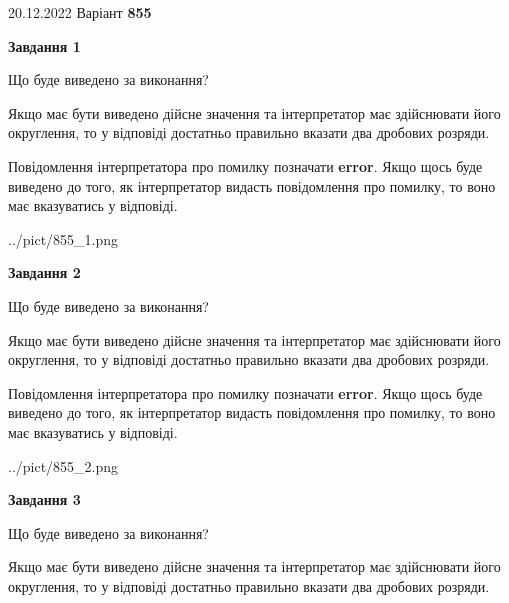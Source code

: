 \documentclass[12pt, ukrainian]{article}
\begin{document}
{20.12.2022 Варіант \No \textbf { 855 }\par}
{
\begin {Large}

{\begin {center}\textbf{Завдання 1}\end {center}}\par
Що буде виведено за виконання? \par

Якщо має бути виведено дійсне значення та інтерпретатор має здійснювати його округлення, 
то у відповіді достатньо правильно вказати два дробових розряди.

Повідомлення інтерпретатора про помилку позначати \textbf{error}.
Якщо щось буде виведено до того, як інтерпретатор видасть повідомлення про помилку, 
то воно має вказуватись у відповіді. \par

\begin{center}
	{../pict/855_1.png}
\end{center}
\newpage

{\begin {center}\textbf{Завдання 2}\end {center}}\par
Що буде виведено за виконання? \par

Якщо має бути виведено дійсне значення та інтерпретатор має здійснювати його округлення, 
то у відповіді достатньо правильно вказати два дробових розряди.

Повідомлення інтерпретатора про помилку позначати \textbf{error}.
Якщо щось буде виведено до того, як інтерпретатор видасть повідомлення про помилку, 
то воно має вказуватись у відповіді. \par

\begin{center}
	{../pict/855_2.png}
\end{center}
\newpage

{\begin {center}\textbf{Завдання 3}\end {center}}\par
Що буде виведено за виконання? \par

Якщо має бути виведено дійсне значення та інтерпретатор має здійснювати його округлення, 
то у відповіді достатньо правильно вказати два дробових розряди.


\end{Large}}
\end{document}
